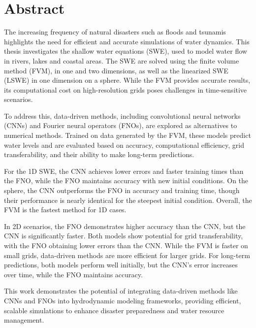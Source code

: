 \chapter*{Abstract}

The increasing frequency of natural disasters such as floods and tsunamis highlights the need for efficient and accurate simulations of water dynamics.
This thesis investigates the shallow water equations (SWE), used to model water flow in rivers, lakes and coastal areas.
The SWE are solved using the finite volume method (FVM), in one and two dimensions, as well as the linearized SWE (LSWE) in one dimension on a sphere.
While the FVM provides accurate results, its computational cost on high-resolution grids poses challenges in time-sensitive scenarios.

\noindent To address this, data-driven methods, including convolutional neural networks (CNNs) and Fourier neural operators (FNOs), are explored as alternatives to numerical methods.
Trained on data generated by the FVM, these models predict water levels and are evaluated based on accuracy, computational efficiency, grid transferability, and their ability to make long-term predictions.

\noindent For the 1D SWE, the CNN achieves lower errors and faster training times than the FNO, while the FNO maintains accuracy with new initial conditions.
On the sphere, the CNN outperforms the FNO in accuracy and training time, though their performance is nearly identical for the steepest initial condition.
Overall, the FVM is the fastest method for 1D cases.

\noindent In 2D scenarios, the FNO demonstrates higher accuracy than the CNN, but the CNN is significantly faster.
Both models show potential for grid transferability, with the FNO obtaining lower errors than the CNN.
While the FVM is faster on small grids, data-driven methods are more efficient for larger grids.
For long-term predictions, both models perform well initially, but the CNN's error increases over time, while the FNO maintains accuracy.

\noindent 
This work demonstrates the potential of integrating data-driven methods like CNNs and FNOs into hydrodynamic modeling frameworks, providing efficient, scalable simulations to enhance disaster preparedness and water resource management.


